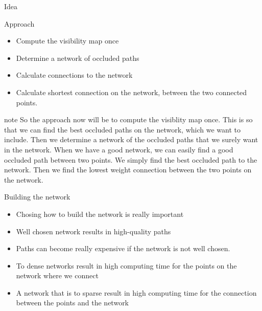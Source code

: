 \begin{frame}{Idea}
	\centering
	\only<1>{\exampleimg{network_ex1}}%
	\only<2>{\exampleimg{network_ex2}}%
	\only<3>{\exampleimg{network_ex3}}
\end{frame}

\begin{frame}{Approach}
	\begin{itemize}
		\item Compute the visibility map once
		\item Determine a network of occluded paths
		\item Calculate connections to the network
		\item Calculate shortest connection on the network, between the two connected points. 
	\end{itemize}
	note{
		So the approach now will be to compute the visiblity map once. 
		This is so that we can find the best occluded paths on the network, which we want to include. 
		Then we determine a network of the occluded paths that we surely want in the network. 
		When we have a good network, we can easily find a good occluded path between two points. 
		We simply find the best occluded path to the network.
		Then we find the lowest weight connection between the two points on the network. 
	}
\end{frame}



\begin{frame}{Building the network}
	\begin{itemize}
		\item Chosing how to build the network is really important
		\item Well chosen network results in high-quality paths
		\item Paths can become really expensive if the network is not well chosen.
		\item To dense networks result in high computing time for the points on the network where we connect
		\item A network that is to sparse result in high computing time for the connection between the points and the network
	\end{itemize}

\end{frame}

